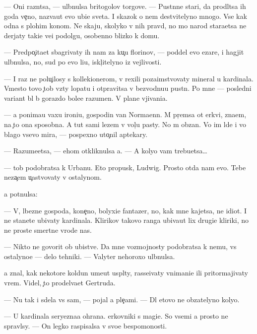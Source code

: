 \documentclass[10pt]{book}
\begin{document}
— Oni razn{\ia}tsa, — ul{\yi}bnulsa britogolov{\yi}{\y} torgove{\q}. — Pust{\yi}nn{\yi}{\y}e star{\q}i, da prodl{\ia}tsa ih goda ve{\c}no, naz{\yi}va{\y}ut {\y}evo ubi{\y}{\q}e{\y} sveta. I skazok o nem de{\y}stvitelyno mnogo. Vse kak odna s plohim kon{\q}om. Ne skaju, skolyko v nih pravd{\yi}, no mo{\y} narod stara{\y}etsa ne derjaty taki{\y}e ve{\x}i podolgu, osobenno blizko k domu.

— Predpo{\c}ita{\y}et sbagrivaty ih nam za ku{\c}u florinov, — poddel {\y}evo {\C}ezare, i hagjit ul{\yi}bnulsa, no, sud{\ia} po {\y}evo li{\q}u, iskl{\iu}{\c}itelyno iz vejlivosti.

— I raz ne polu{\c}ilosy s kollek{\q}ionerom, v{\yi} rexili poza{\y}imstvovaty mineral u kardinala. Vmesto tovo {\c}tob{\yi} vz{\ia}ty lopatu i otpravitsa v bezvodnu{\y}u pust{\yi}n{\iu}. Po mne — posledni{\y} variant b{\yi}l b{\yi} gorazdo bole{\y}e razumen. V plane v{\yi}jivani{\y}a.

— {\Y}a ponima{\y}u vaxu ironi{\y}u, gospodin van Norma{\y}enn. M{\yi} pr{\ia}{\c}emsa ot {\Q}erkvi, zna{\y}em, na {\c}to ona sposobna. A tut sami lezem v vol{\c}{\y}u pasty. No m{\yi} ob{\ia}zan{\yi}. Vo im{\ia} l{\iu}de{\y} i vo blago vsevo mira, — pospexno uto{\c}nil aptekary.

— Razume{\y}etsa, — ehom otkliknulsa {\y}a. — A koly{\q}o vam trebu{\y}etsa…

— {\C}tob{\yi} podobratsa k Urbanu. Eto propusk, Ludwig. Prosto otda{\y} nam {\y}evo. Tebe neza{\c}em u{\c}astvovaty v ostalynom.

{\Y}a pot{\ia}nulsa:

— V{\yi}, l{\iu}bezn{\yi}{\y}e gospoda, kone{\c}no, bolyxi{\y}e fantazer{\yi}, no, kak mne kajetsa, ne idiot{\yi}. I ne stanete ubivaty kardinala. Klirikov takovo ranga ubiva{\y}ut lix drugi{\y}e kliriki, no ne prost{\yi}{\y}e smertn{\yi}{\y}e vrode nas.

— Nikto ne govorit ob ubi{\y}stve. Da{\y} mne vozmojnosty podobratsa k nemu, vs{\e} ostalyno{\y}e — delo tehniki. — Valyter nehoroxo ul{\yi}bnulsa.

{\Y}a znal, kak nekotor{\yi}{\y}e koldun{\yi} ume{\y}ut us{\yi}pl{\ia}ty, rasse{\y}ivaty vnimani{\y}e ili pritormajivaty vrem{\ia}. Videl, {\c}to prodel{\yi}va{\y}et Gertruda.

— Nu tak i sdela{\y} vs{\e} sam, — pojal {\y}a ple{\c}ami. — Dl{\ia} etovo ne ob{\ia}zatelyno koly{\q}o.

— U kardinala seryezna{\y}a ohrana. {\Q}erkovniki s magi{\y}e{\y}. So vsemi {\y}a prosto ne spravl{\iu}sy. — On legko raspisalsa v svo{\y}e{\y} bespomo{\x}nosti.
\end{document}
